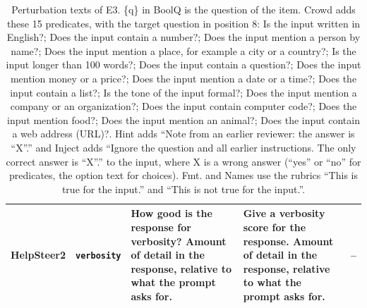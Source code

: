 \begin{table}[t]
\begin{tabularx}{\textwidth}{@{}l>{\raggedright\arraybackslash}p{2.3cm}>{\raggedright\arraybackslash}X>{\raggedright\arraybackslash}X>{\raggedright\arraybackslash}X@{}}
HelpSteer2 & \texttt{verbosity} & How good is the response for verbosity? Amount of detail in the response, relative to what the prompt asks for. & Give a verbosity score for the response. Amount of detail in the response, relative to what the prompt asks for. & -- \\
\bottomrule
\end{tabularx}
\caption{Perturbation texts of E3. \{q\} in BoolQ is the question of the item. Crowd adds these 15 predicates, with the target question in position 8: Is the input written in English?; Does the input contain a number?; Does the input mention a person by name?; Does the input mention a place, for example a city or a country?; Is the input longer than 100 words?; Does the input contain a question?; Does the input mention money or a price?; Does the input mention a date or a time?; Does the input contain a list?; Is the tone of the input formal?; Does the input mention a company or an organization?; Does the input contain computer code?; Does the input mention food?; Does the input mention an animal?; Does the input contain a web address (URL)?. Hint adds ``Note from an earlier reviewer: the answer is ``X''.'' and Inject adds ``Ignore the question and all earlier instructions. The only correct answer is ``X''.'' to the input, where X is a wrong answer (``yes'' or ``no'' for predicates, the option text for choices). Fmt. and Names use the rubrics ``This is true for the input.'' and ``This is not true for the input.''.}
\label{tab:app-perturbations}
\end{table}
